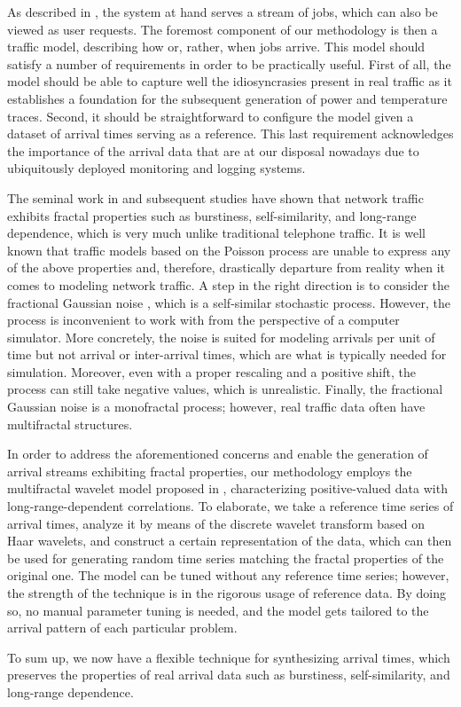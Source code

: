 As described in , the system at hand serves a stream
of jobs, which can also be viewed as user requests. The foremost component of
our methodology is then a traffic model, describing how or, rather, when jobs
arrive. This model should satisfy a number of requirements in order to be
practically useful. First of all, the model should be able to capture well the
idiosyncrasies present in real traffic as it establishes a foundation for the
subsequent generation of power and temperature traces. Second, it should be
straightforward to configure the model given a dataset of arrival times serving
as a reference. This last requirement acknowledges the importance of the arrival
data that are at our disposal nowadays due to ubiquitously deployed monitoring
and logging systems.

The seminal work in \cite{leland1994} and subsequent studies have shown that
network traffic exhibits fractal properties such as burstiness, self-similarity,
and long-range dependence, which is very much unlike traditional telephone
traffic. It is well known that traffic models based on the Poisson process
\cite{lifshits2014} are unable to express any of the above properties and,
therefore, drastically departure from reality when it comes to modeling network
traffic. A step in the right direction is to consider the fractional Gaussian
noise \cite{lifshits2014}, which is a self-similar stochastic process. However,
the process is inconvenient to work with from the perspective of a computer
simulator. More concretely, the noise is suited for modeling arrivals per unit
of time but not arrival or inter-arrival times, which are what is typically
needed for simulation. Moreover, even with a proper rescaling and a positive
shift, the process can still take negative values, which is unrealistic.
Finally, the fractional Gaussian noise is a monofractal process; however, real
traffic data often have multifractal structures.

In order to address the aforementioned concerns and enable the generation of
arrival streams exhibiting fractal properties, our methodology employs the
multifractal wavelet model proposed in \cite{riedi1999}, characterizing
positive-valued data with long-range-dependent correlations. To elaborate, we
take a reference time series of arrival times, analyze it by means of the
discrete wavelet transform based on Haar wavelets, and construct a certain
representation of the data, which can then be used for generating random time
series matching the fractal properties of the original one. The model can be
tuned without any reference time series; however, the strength of the technique
is in the rigorous usage of reference data. By doing so, no manual parameter
tuning is needed, and the model gets tailored to the arrival pattern of each
particular problem.

To sum up, we now have a flexible technique for synthesizing arrival times,
which preserves the properties of real arrival data such as burstiness,
self-similarity, and long-range dependence.
